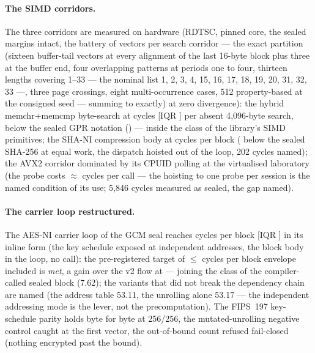 \documentclass[10pt,a4paper]{article}
\begin{document}
\paragraph{The SIMD corridors.} The three corridors are measured on
hardware (RDTSC, pinned core, the sealed margins intact, the battery
of \batterieVecteurs{} vectors per search corridor --- the exact partition \batteriePartition{} (sixteen buffer-tail vectors at every alignment of the last 16-byte block plus three at the buffer end, four overlapping patterns at periods one to four, thirteen lengths covering 1--33 --- the nominal list 1, 2, 3, 4, 15, 16, 17, 18, 19, 20, 31, 32, 33 ---, three page crossings, eight multi-occurrence cases, 512 property-based at the consigned seed --- summing to \batterieVecteurs{} exactly) at zero divergence): the hybrid memchr+memcmp byte-search at
\hybrideCycles{} cycles [IQR \hybrideIqr{}] per absent 4{,}096-byte
search, \hybrideGain{} below the sealed GPR notation (\scelleGprCycles{})
--- inside the class of the library's SIMD primitives; the SHA-NI
compression body at \shaniCorpsCbloc{} cycles per block (\shaniGain{}
below the sealed SHA-256 at equal work, the dispatch hoisted out of
the loop, 202 cycles named); the AVX2 corridor dominated by its
CPUID polling at the virtualised laboratory (the probe costs
$\approx$\cpuidSondage{} cycles per call --- the hoisting to one probe
per session is the named condition of its use; 5{,}846 cycles measured
as sealed, the gap named).

\paragraph{The carrier loop restructured.} The AES-NI carrier loop
of the GCM seal reaches \porteuseVquatreInline{} cycles per block [IQR
\porteuseVquatreIqr{}] in its inline form (the key schedule exposed
at independent addresses, the block body in the loop, no call): the
pre-registered target of $\le$\porteuseCible{} cycles per block
envelope included is \emph{met}, a \porteuseGain{} gain over the v2
flow at \porteuseVdeuxFlux{} --- joining the class of the compiler-called sealed block (7.62); the variants that did not break
the dependency chain are named (the address table 53.11, the unrolling alone 53.17 --- the independent addressing mode is the
lever, not the precomputation). The FIPS~197 key-schedule parity
holds byte for byte at 256/256, the mutated-unrolling negative
control caught at the first vector, the out-of-bound count refused
fail-closed (nothing encrypted past the bound).
\end{document}
